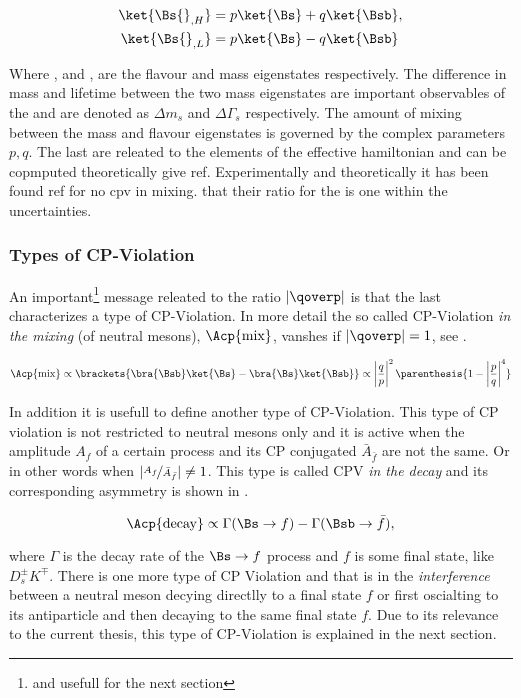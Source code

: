 \begin{align}
\ket{\Bs{}_{,H}} &= p \ket{\Bs} + q \ket{\Bsb}, \nonumber \\
\ket{\Bs{}_{,L}} &= p \ket{\Bs} - q \ket{\Bsb}
\label{bs_mass_eigen}
\end{align}

\noindent Where \ket{\Bs}, \ket{\Bsb} and ,  are the flavour and mass
eigenstates respectively. The difference in mass and lifetime between the two mass eigenstates are important
observables of the \BBbarSyst and are denoted as $\Delta m_s$ and $\Delta\Gamma_s$ respectively.
The amount of mixing between the mass and flavour eigenstates is governed by
the complex parameters $p,q$. The last are releated to the elements of the effective hamiltonian and can be
copmputed theoretically{\color{red} give ref}. Experimentally and theoretically it has been found{\color{red} ref for no cpv in mixing.}
that their ratio for the \BBbarSyst is one within the uncertainties.

\subsubsection{Types of CP-Violation}
An important\footnote{and usefull for the next section} message releated to the ratio $|\qoverp|$ is that
the last characterizes a type of CP-Violation. In more detail the so called CP-Violation {\it in the mixing} (of neutral mesons),
$\Acp{\text{mix}}$, vanshes if $|\qoverp|= 1$, see .

\begin{equation}
\Acp{\text{mix}} \propto \brackets{\bra{\Bsb}\ket{\Bs} - \bra{\Bs}\ket{\Bsb}} \propto \left|\frac{q}{p}\right|^2 \parenthesis{ 1 - \left|\frac{p}{q}\right|^4}
\label{acp_mixing}
\end{equation}

\noindent In addition it is usefull to define another type of CP-Violation.
This type of CP violation is not restricted to neutral mesons only and it is active when the amplitude $A_f$ of a certain
process and its CP conjugated $\bar{A}_{\bar{f}}$ are not the same. Or in other words when $|\nicefrac{A_f}{\bar{A}_{\bar{f}}}| \neq 1$.
This type is called CPV {\it in the decay} and its corresponding asymmetry is shown in .

\begin{equation}
\Acp{\text{decay}} \propto \Gamma(\Bs \rightarrow f) - \Gamma(\Bsb \rightarrow \bar{f}),
\label{cpv_decay}
\end{equation}

\noindent where $\Gamma$ is the decay rate of the $\Bs \rightarrow f$ process and $f$ is some final state,
like $D_s^{\pm}K^{\mp}$. There is one more type of CP Violation and that is in the {\it interference} between
a neutral meson decying directlly to a final state $f$ or first oscialting to its antiparticle and then decaying
to the same final state $f$. Due to its relevance to the current thesis, this type of CP-Violation is explained
in the next section.

